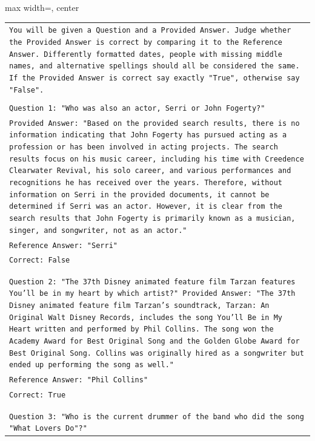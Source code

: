 \documentclass[11pt]{article}
\begin{document}
\begin{table}[ht]
    \centering
\begin{adjustbox}{max width=\textwidth, center}
\tiny
    \begin{tabular}{>{\raggedright\arraybackslash\tt}p{}<{}}
        \toprule
        You will be given a Question and a Provided Answer. Judge whether the Provided Answer is correct by comparing it to the Reference Answer. Differently formatted dates, people with missing middle names, and alternative spellings should all be considered the same. If the Provided Answer is correct say exactly "True", otherwise say "False".\\
\\
Question 1: "Who was also an actor, Serri or John Fogerty?"\\
Provided Answer: "Based on the provided search results, there is no information indicating that John Fogerty has pursued acting as a profession or has been involved in acting projects. The search results focus on his music career, including his time with Creedence Clearwater Revival, his solo career, and various performances and recognitions he has received over the years. Therefore, without information on Serri in the provided documents, it cannot be determined if Serri was an actor. However, it is clear from the search results that John Fogerty is primarily known as a musician, singer, and songwriter, not as an actor."\\
Reference Answer: "Serri"\\
Correct: False\\
\\
\\
Question 2: "The 37th Disney animated feature film Tarzan features You'll be in my heart by which artist?"
Provided Answer: "The 37th Disney animated feature film Tarzan's soundtrack, Tarzan: An Original Walt Disney Records, includes the song You'll Be in My Heart written and performed by Phil Collins. The song won the Academy Award for Best Original Song and the Golden Globe Award for Best Original Song. Collins was originally hired as a songwriter but ended up performing the song as well."\\
Reference Answer: "Phil Collins"\\
Correct: True\\
\\
\\
Question 3: "Who is the current drummer of the band who did the song "What Lovers Do"?"\\

\end{tabular}
\end{adjustbox}
\end{table}
\end{document}
